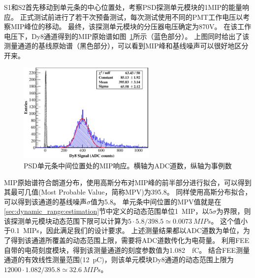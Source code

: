S1和S2首先移动到单元条的中心位置处，考察PSD探测单元模块的1MIP的能量响应。
正式测试前进行了若干次预备测试，每次测试使用不同的PMT工作电压以考察MIP峰位的移动。
最终，该探测单元模块的分压器电压确定为870V。
在该工作电压下，Dy8通道得到的MIP原始谱如图~\ref{fig:dynamic_range:mip}所示（蓝色部分）。
上图同时给出了该测量通道的基线原始谱（黑色部分），可以看到MIP峰和基线噪声可以很好地区分开来。
\begin{figure}[htbp]
	\centering
	\includegraphics[width=0.6\textwidth]{chap/dynamic_range/fig/mip.eps}
	\caption{PSD单元条中间位置处的MIP响应。横轴为ADC道数，纵轴为事例数}
	\label{fig:dynamic_range:mip}
\end{figure}
MIP原始谱符合朗道分布，使用高斯分布对MIP峰的前半部分进行拟合，可以得到其最可几值(Most Probable Value，简称MPV)为395.8。
同样使用高斯分布拟合，可以得到该通道的基线噪声$\sigma$值为5.8。
单元条中间位置的MPV值就是在\ref{sec:dynamic_range:estimation}节中定义的动态范围单位\SI{1}{MIP}，以$5\sigma$为界限，则该探测单元模块动态范围下限可以计算为$5\cdot5.8/398.5\simeq\SI{0.0073}{MIPs}$。
这个值小于\SI{0.1}{MIPs}，因此满足我们的设计要求。
上述测量结果都以ADC道数为单位，为了得到该通道所覆盖的动态范围上限，需要将ADC道数传化为电荷量。
利用FEE自带的电荷刻度模块，得到该测量通道的刻度参数值为\SI{1.082}{\per\femto\coulomb}。
结合FEE测量通道的有效线性测量范围(\SI{12}{\pico\coulomb})，则该单元模块Dy8通道的动态范围上限为$12000\cdot 1.082/395.8 \simeq \SI{32.6}{MIPs}$。

